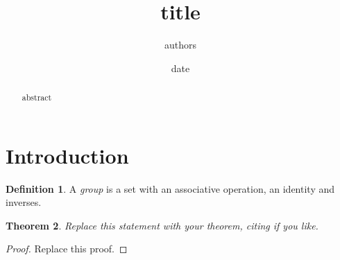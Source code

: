 \documentclass[11pt]{amsart}
\title{{{title}}}
\author{{{authors}}}
\date{{{date}}}
\newtheorem{theorem}{Theorem}[section]
\theoremstyle{definition}
\newtheorem{definition}[theorem]{Definition}
\begin{document}
\begin{abstract}
{{abstract}}
\end{abstract}
\maketitle

\section{Introduction}
\begin{definition}
A \emph{group} is a set with an associative operation, an identity and inverses.
\end{definition}

\begin{theorem}\label{thm:main}
Replace this statement with your theorem, citing \cite{lamport1994} if you like.
\end{theorem}
\begin{proof}
Replace this proof.
\end{proof}



\end{document}
